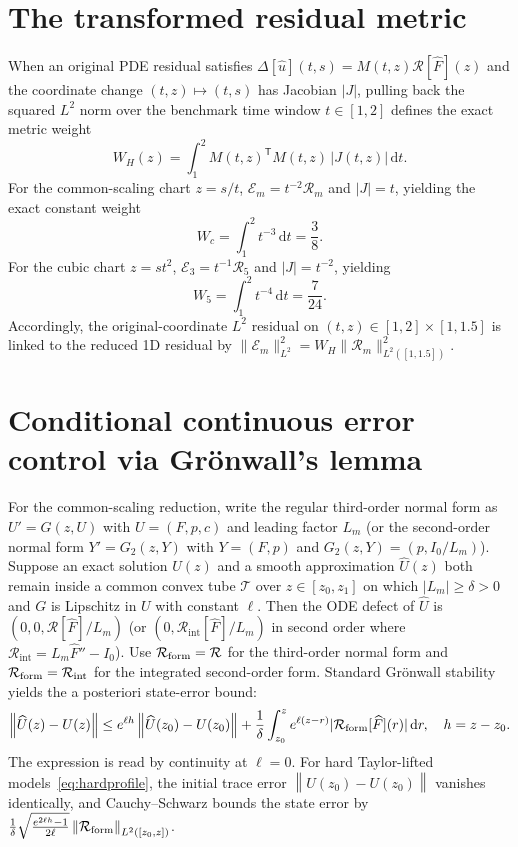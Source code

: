 \documentclass[11pt,a4paper,oneside]{report}
\numberwithin{equation}{chapter}
\newcommand{\E}{\mathcal E}
\newcommand{\R}{\mathcal R}
\newcommand{\dd}{\mathrm d}
\newcommand{\norm}[1]{\left\lVert#1\right\rVert}
\begin{document}
\section{The transformed residual metric}
When an original PDE residual satisfies $\Delta[\widehat u](t,s)=M(t,z)\R[\widehat F](z)$ and the coordinate change $(t,z)\mapsto(t,s)$ has Jacobian $|J|$, pulling back the squared $L^2$ norm over the benchmark time window $t\in[1,2]$ defines the exact metric weight
\begin{equation}\label{eq:metric}
W_H(z)=\int_{1}^{2}M(t,z)^{\mathsf T}M(t,z)\,|J(t,z)|\,\dd t.
\end{equation}
For the common-scaling chart $z=s/t$, $\E_m = t^{-2}\R_m$ and $|J|=t$, yielding the exact constant weight
\begin{equation}
W_c=\int_1^2 t^{-3}\,\dd t=\frac{3}{8}.
\end{equation}
For the cubic chart $z=st^2$, $\E_3 = t^{-1}\R_5$ and $|J|=t^{-2}$, yielding
\begin{equation}
W_5=\int_1^2 t^{-4}\,\dd t=\frac{7}{24}.
\end{equation}
Accordingly, the original-coordinate $L^2$ residual on $(t,z)\in[1,2]\times[1,1.5]$ is linked to the reduced 1D residual by $\|\E_m\|_{L^2}^2 = W_H \|\R_m\|_{L^2([1,1.5])}^2$.

\section{Conditional continuous error control via Gr\"onwall's lemma}\label{sec:conditional-error}
For the common-scaling reduction, write the regular third-order normal form as $U'=G(z,U)$ with $U=(F,p,c)$ and leading factor $L_m$ (or the second-order normal form $Y'=G_2(z,Y)$ with $Y=(F,p)$ and $G_2(z,Y)=(p,I_0/L_m)$). Suppose an exact solution $U(z)$ and a smooth approximation $\widehat{U}(z)$ both remain inside a common convex tube $\mathcal{T}$ over $z\in[z_0,z_1]$ on which $|L_m|\ge \delta > 0$ and $G$ is Lipschitz in $U$ with constant $\ell$. Then the ODE defect of $\widehat{U}$ is $(0,0,\R[\widehat{F}]/L_m)$ (or $(0,\R_{\mathrm{int}}[\widehat{F}]/L_m)$ in second order where $\R_{\mathrm{int}}=L_m\widehat{F}''-I_0$). Use $\R_{\rm form}=\R$ for the third-order normal form and $\R_{\rm form}=\R_{\rm int}$ for the integrated second-order form. Standard Gr\"onwall stability \cite{teschl2012,mishra2023} yields the a posteriori state-error bound:
\begin{equation}\label{eq:gronwall}
\norm{\widehat U(z)-U(z)}\leq e^{\ell h}\norm{\widehat U(z_0)-U(z_0)}
 +\frac1\delta\int_{z_0}^{z}e^{\ell(z-r)}|\R_{\rm form}[\widehat F](r)|\,\dd r,
\quad h=z-z_0.
\end{equation}
The expression is read by continuity at $\ell=0$. For hard Taylor-lifted models~\eqref{eq:hardprofile}, the initial trace error $\norm{\widehat{U}(z_0)-U(z_0)}$ vanishes identically, and Cauchy--Schwarz bounds the state error by $\frac{1}{\delta}\sqrt{\frac{e^{2\ell h}-1}{2\ell}}\norm{\R_{\rm form}}_{L^2([z_0,z])}$.
\end{document}
